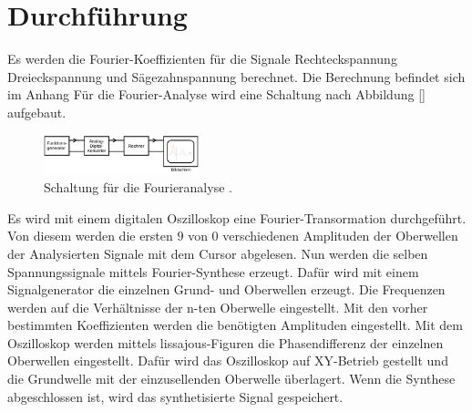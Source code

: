 \section{Durchführung}
\label{sec:Durchführung}
Es werden die Fourier-Koeffizienten für die Signale Rechteckspannung
Dreieckspannung und Sägezahnspannung berechnet. Die Berechnung befindet sich im
Anhang
Für die Fourier-Analyse wird eine Schaltung nach Abbildung \ref{} aufgebaut.
\begin{figure}
  \centering
  \includegraphics[width=0.4\textwidth]{Analyseschaltung.png}
  \caption{Schaltung für die Fourieranalyse \cite{sample}.}
  \label{fig:Fouriertrafo}
\end{figure}
Es wird mit einem digitalen Oszilloskop eine Fourier-Transormation durchgeführt.
Von diesem werden die ersten $9$ von $0$ verschiedenen Amplituden der Oberwellen
der Analysierten Signale mit dem Cursor abgelesen.
Nun werden die selben Spannungssignale mittels Fourier-Synthese erzeugt. Dafür
wird mit einem Signalgenerator die einzelnen Grund- und Oberwellen erzeugt. Die
Frequenzen werden auf die Verhältnisse der n-ten Oberwelle eingestellt.
Mit den vorher bestimmten Koeffizienten werden die benötigten Amplituden
eingestellt. Mit dem Oszilloskop werden mittels lissajous-Figuren die
Phasendifferenz der einzelnen Oberwellen eingestellt. Dafür wird das Oszilloskop
auf XY-Betrieb gestellt und die Grundwelle mit der einzusellenden Oberwelle
überlagert. Wenn die Synthese abgeschlossen ist, wird das synthetisierte Signal
gespeichert.
